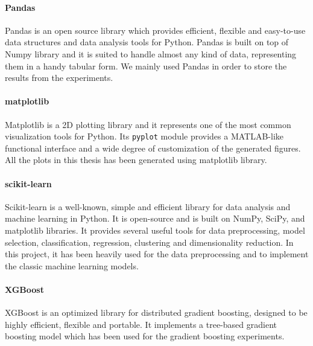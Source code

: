 \paragraph{Pandas} \cite{pandas} Pandas is an open source library which provides efficient, flexible and easy-to-use data structures and data analysis tools for Python. Pandas is built on top of Numpy library and it is suited to handle almost any kind of data, representing them in a handy tabular form. We mainly used Pandas in order to store the results from the experiments.

\paragraph{matplotlib} \cite{matplotlib} Matplotlib is a 2D plotting library and it represents one of the most common visualization tools for Python. Its \texttt{pyplot} module provides a MATLAB-like functional interface and a wide degree of customization of the generated figures. All the plots in this thesis has been generated using matplotlib library.

\paragraph{scikit-learn} \cite{scikit-learn} Scikit-learn is a well-known, simple and efficient library for data analysis and machine learning in Python. It is open-source and is built on NumPy, SciPy, and matplotlib libraries. It provides several useful tools for data preprocessing, model selection, classification, regression, clustering and dimensionality reduction. In this project, it has been heavily used for the data preprocessing and to implement the classic machine learning models.

\paragraph{XGBoost} \cite{xgboost} XGBoost is an optimized library for distributed gradient boosting, designed to be highly efficient, flexible and portable. It implements a tree-based gradient boosting model which has been used for the gradient boosting experiments.

